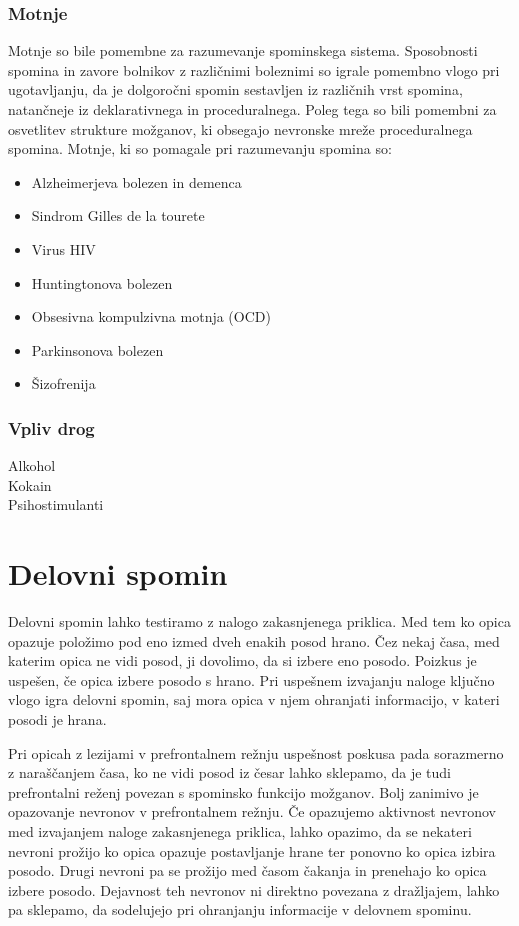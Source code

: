 \documentclass[10pt,a4paper]{article}
\begin{document}
\subsubsection{Motnje}
Motnje so bile pomembne za razumevanje spominskega sistema. Sposobnosti spomina in zavore bolnikov z različnimi boleznimi so igrale pomembno vlogo pri ugotavljanju, da je dolgoročni spomin sestavljen iz različnih vrst spomina, natančneje iz deklarativnega in proceduralnega. Poleg tega so bili pomembni za osvetlitev strukture možganov, ki obsegajo nevronske mreže proceduralnega spomina.
Motnje, ki so pomagale pri razumevanju spomina so: 
\begin{itemize}
\item Alzheimerjeva bolezen in demenca
\item Sindrom Gilles de la tourete
\item Virus HIV
\item Huntingtonova bolezen
\item Obsesivna kompulzivna motnja (OCD)
\item Parkinsonova bolezen
\item Šizofrenija
\end{itemize}


\subsubsection{Vpliv drog}
Alkohol\\
Kokain\\
Psihostimulanti

\section{Delovni spomin}
Delovni spomin lahko testiramo z nalogo zakasnjenega priklica. Med tem ko opica opazuje položimo pod eno izmed dveh enakih posod hrano. Čez nekaj časa, med katerim opica ne vidi posod, ji dovolimo, da si izbere eno posodo. Poizkus je uspešen, če opica izbere posodo s hrano. Pri uspešnem izvajanju naloge ključno vlogo igra delovni spomin, saj mora opica v njem ohranjati informacijo, v kateri posodi je hrana.

Pri opicah z lezijami v prefrontalnem režnju uspešnost poskusa pada sorazmerno z naraščanjem časa, ko ne vidi posod iz česar lahko sklepamo, da je tudi prefrontalni reženj povezan s spominsko funkcijo možganov. Bolj zanimivo je opazovanje nevronov v prefrontalnem režnju. Če opazujemo aktivnost nevronov med izvajanjem naloge zakasnjenega priklica, lahko opazimo, da se nekateri nevroni prožijo ko opica opazuje postavljanje hrane ter ponovno ko opica izbira posodo. Drugi nevroni pa se prožijo med časom čakanja in prenehajo ko opica izbere posodo. Dejavnost teh nevronov ni direktno povezana z dražljajem, lahko pa sklepamo, da sodelujejo pri ohranjanju informacije v delovnem spominu.
\end{document}

